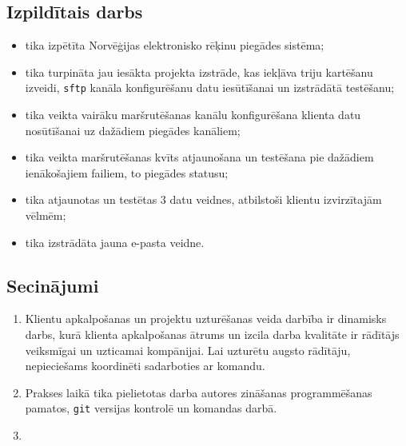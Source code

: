 \subsection{Izpildītais darbs}
\begin{itemize}
    \item tika izpētīta Norvēģijas elektronisko rēķinu piegādes sistēma;
    \item tika turpināta jau iesākta projekta izstrāde, kas iekļāva triju kartēšanu izveidi, \texttt{sftp} kanāla konfigurēšanu datu iesūtīšanai un izstrādātā testēšanu;
    \item tika veikta vairāku maršrutēšanas kanālu konfigurēšana klienta datu nosūtīšanai uz dažādiem piegādes kanāliem;
    \item tika veikta maršrutēšanas kvīts atjaunošana un testēšana pie dažādiem ienākošajiem failiem, to piegādes statusu;
    \item tika atjaunotas un testētas 3 datu veidnes, atbilstoši klientu izvirzītajām vēlmēm;
    \item tika izstrādāta jauna e-pasta veidne.
\end{itemize}

\subsection{Secinājumi}
\begin{enumerate}
    \item Klientu apkalpošanas un projektu uzturēšanas veida darbība ir dinamisks darbs, kurā klienta apkalpošanas ātrums un izcila darba kvalitāte ir rādītājs veiksmīgai un uzticamai kompānijai. Lai uzturētu augsto rādītāju, nepieciešams koordinēti sadarboties ar komandu.
    \item Prakses laikā tika pielietotas darba autores zināšanas programmēšanas pamatos, \texttt{git} versijas kontrolē un komandas darbā.
    \item
\end{enumerate}





